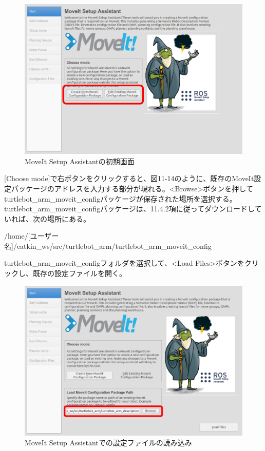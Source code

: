 \begin{figure}[htp]
  \centering
  \includegraphics[width=12cm]{pictures/chapter11/pic_11_13.png}
  \caption{MoveIt Setup Assistantの初期画面}
\end{figure}

[Choose mode]で右ボタンをクリックすると、図11-14のように、既存のMoveIt設定パッケージのアドレスを入力する部分が現れる。<Browse>ボタンを押してturtlebot\_arm\_moveit\_configパッケージが保存された場所を選択する。 turtlebot\_arm\_moveit\_configパッケージは、11.4.2項に従ってダウンロードしていれば、次の場所にある。

/home/[ユーザー名]/catkin\_ws/src/turtlebot\_arm/turtlebot\_arm\_moveit\_config

turtlebot\_arm\_moveit\_configフォルダを選択して、<Load Files>ボタンをクリックし、既存の設定ファイルを開く。

\begin{figure}[htp]
  \centering
  \includegraphics[width=12cm]{pictures/chapter11/pic_11_14.png}
  \caption{MoveIt Setup Assistantでの設定ファイルの読み込み}
\end{figure}

